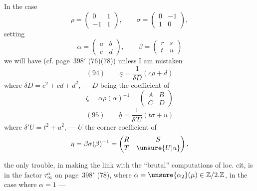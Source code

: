 In the  case
\[
\rho=\begin{pmatrix}0&1\\-1&1\end{pmatrix},\qquad
\sigma=\begin{pmatrix}0&-1\\1&0\end{pmatrix},
\]
setting
\[
\alpha=\begin{pmatrix}a&b\\c&d\end{pmatrix},\qquad
\beta=\begin{pmatrix}r&s\\t&u\end{pmatrix}
\]
we will have (cf. page\ $398'$ (76)(78)) unless I am mistaken
\[
(94)\qquad \underline a=\frac1{\delta D}(c\rho+d)
\]
\inserted{\[
\left(=\frac1{c^2+cd+d^2}(c\rho+d)\right)
\]}
where $\delta D=c^2+cd+d^2$, --- $D$ being the  coefficient of
\[
\zeta=\alpha\rho(\alpha)^{-1}=\begin{pmatrix}A&B\\C&D\end{pmatrix}
\]
\[
(95)\qquad \underline b=\frac1{\delta' U}(t\sigma+u)
\]
\inserted{\[
=\frac1{t^2+u^2}(t\sigma+u)
\]}
where $\delta' U=t^2+u^2$, --- $U$ the corner coefficient of
\[
\eta=\beta\sigma(\beta)^{-1}=\begin{pmatrix}R&S\\T&\unsure{U|u}\end{pmatrix},
\]

the only trouble, in making the link with the ``brutal'' computations of loc. cit, is in the factor $\tau_\infty^\alpha$ on page\ $398'$ (78), where $\alpha=\unsure{\alpha_2}(\mu)\in\mathbb Z/2.\mathbb Z$, in the case where $\alpha=1$ ---

